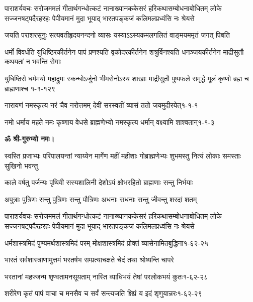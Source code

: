 \fourlineindentedshloka
{पाराशर्यवचः सरोजममलं गीतार्थगन्धोत्कटं}
{नानाख्यानककेसरं हरिकथासम्बोधनाबोधितम्}
{लोके सज्जनषट्पदैरहरहः पेपीयमानं मुदा}
{भूयाद् भारतपङ्कजं कलिमलप्रध्वंसि नः श्रेयसे}

\twolineshloka
{जयति पराशरसूनुः सत्यवतीहृदयनन्दनो व्यासः}
{यस्याऽऽस्यकमलगलितं वाङ्मयममृतं जगत् पिबति}


\fourlineindentedshloka
{धर्मो विवर्धति युधिष्ठिरकीर्तनेन}
{पापं प्रणश्यति वृकोदरकीर्तनेन}
{शत्रुर्विनश्यति धनञ्जयकीर्तनेन}
{माद्रीसुतौ कथयतां न भवन्ति रोगाः}

\annofourlineindentedshloka
{युधिष्ठिरो धर्ममयो महाद्रुमः}
{स्कन्धोऽर्जुनो भीमसेनोऽस्य शाखाः}
{माद्रीसुतौ पुष्पफले समृद्धे}
{मूलं कृष्णो ब्रह्म च ब्राह्मणाश्च}
{१-१-१२९}

\annotwolineshloka
{नारायणं नमस्कृत्य नरं चैव नरोत्तमम्}
{देवीं सरस्वतीं व्यासं ततो जयमुदीरयेत्}{१-१-१}

\annotwolineshloka
{नमो धर्माय महते नमः कृष्णाय वेधसे}
{ब्राह्मणेभ्यो नमस्कृत्य धर्मान् वक्ष्यामि शाश्वतान्}{१-१-३}


\resetShloka
\centerline{\textbf{ॐ श्री-गुरुभ्यो नमः।}}

\resetShloka
{}

\fourlineindentedshloka
{स्वस्ति प्रजाभ्यः परिपालयन्तां}
{न्याय्येन मार्गेण महीं महीशाः}
{गोब्राह्मणेभ्यः शुभमस्तु नित्यं}
{लोकाः समस्ताः सुखिनो भवन्तु}

\twolineshloka
{काले वर्षतु पर्जन्यः पृथिवी सस्यशालिनी}
{देशोऽयं क्षोभरहितो ब्राह्मणाः सन्तु निर्भयाः}

\twolineshloka
{अपुत्राः पुत्रिणः सन्तु पुत्रिणः सन्तु पौत्रिणः}
{अधनाः सधनाः सन्तु जीवन्तु शरदां शतम्}

\fourlineindentedshloka
{पाराशर्यवचः सरोजममलं गीतार्थगन्धोत्कटं}
{नानाख्यानककेसरं हरिकथासम्बोधनाबोधितम्}
{लोके सज्जनषट्पदैरहरहः पेपीयमानं मुदा}
{भूयाद् भारतपङ्कजं कलिमलप्रध्वंसि नः श्रेयसे}



\annotwolineshloka
{धर्मशास्त्रमिदं पुण्यमर्थशास्त्रमिदं परम्}
{मोक्षशास्त्रमिदं प्रोक्तं व्यासेनामितबुद्धिना}{१-६२-२५}

\twolineshloka
{भारतं सर्वशास्त्राणामुत्तमं भरतर्षभ}
{सम्प्रत्याचक्षते चेदं तथा श्रोष्यन्ति चापरे}

\annotwolineshloka
{भरतानां महज्जन्म शृण्वतामनसूयताम्}
{नास्ति व्याधिभयं तेषां परलोकभयं कुतः}{१-६२-२८}

\annotwolineshloka
{शरीरेण कृतं पापं वाचा च मनसैव च}
{सर्वं सन्त्यजति क्षिप्रं य इदं शृणुयान्नरः}{१-६२-२९}

